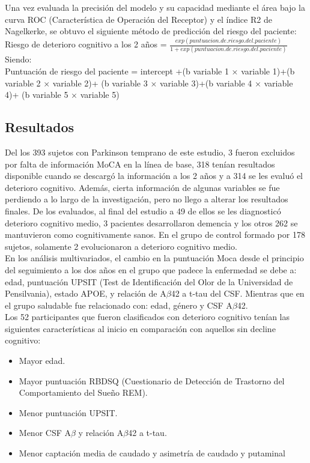 \documentclass[12pt]{article}
\begin{document}
\begin{description}
		Una vez evaluada la precisión del modelo y su capacidad mediante el área bajo la curva ROC (Característica de Operación del Receptor) y el índice R2 de Nagelkerke, se obtuvo el siguiente método de predicción del riesgo del paciente:\\
		
		Riesgo de deterioro cognitivo a los 2 años = $\frac{exp(puntuacion.de.riesgo.del.paciente)}{1 + exp(puntuacion.de.riesgo.del.paciente)}$\\
		
		Siendo:\\
		
		Puntuación de riesgo del paciente = intercept +(b variable 1 ×
		variable 1)+(b variable 2 × variable 2)+ (b variable 3 × 
		variable 3)+(b variable 4 × variable 4)+ (b variable 5 ×
		variable 5)
		
	\end{description}
	
	\subsection{Resultados }
	
	Del los 393 sujetos con Parkinson temprano de este estudio, 3 fueron excluidos por falta de información MoCA en la línea de base, 318 tenían resultados disponible cuando se descargó la información a los 2 años y a 314 se les evaluó el deterioro cognitivo. Además, cierta información de algunas variables se fue perdiendo a lo largo de la investigación, pero no llego a alterar los resultados finales. De los evaluados, al final del estudio a 49 de ellos se les diagnosticó deterioro cognitivo medio, 3 pacientes desarrollaron demencia y los otros 262 se mantuvieron como cognitivamente sanos. En el grupo de control formado por 178 sujetos, solamente 2 evolucionaron a deterioro cognitivo medio.\\
	
	En los análisis multivariados, el cambio en la puntuación Moca desde el principio del seguimiento a los dos años en el grupo que padece la enfermedad se debe a: edad, puntuación UPSIT (Test de Identificación del Olor de la Universidad de Pensilvania), 
	estado APOE, y relación de A$\beta$42 a t-tau del CSF. Mientras que en el grupo saludable fue relacionado con: edad, género y CSF A$\beta$42.\\
	
	Los 52 participantes que fueron clasificados con deterioro cognitivo tenían las siguientes características al inicio en comparación con aquellos sin decline cognitivo:
	\begin{itemize}
		\item Mayor edad.
		\item Mayor puntuación RBDSQ (Cuestionario de Detección de Trastorno del Comportamiento del Sueño REM).
		\item Menor puntuación UPSIT.
		\item Menor CSF A$\beta$ y relación A$\beta$42 a t-tau.
		\item Menor captación media de caudado y
		asimetría de caudado y putaminal
	\end{itemize}	
	
\end{document}
